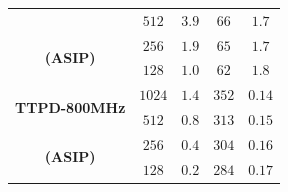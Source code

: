 \documentclass[11pt]{report}
\begin{document}
\begin{table}
{{\begin{tabular}{ccccc}
                                         & $512$  & $3.9$                                                                    & $66$                                                                      & $1.7$                                                                  \\
        \multirow{2}{*}{\bf (ASIP)}      & $256$  & $1.9$                                                                    & $65$                                                                      & $1.7$                                                                  \\
                                         & $128$  & $1.0$                                                                    & $62$                                                                      & $1.8$                                                                  \\
        \midrule
        \multirow{2}{*}{\bf TTPD-800MHz} & $1024$ & $1.4$                                                                    & $352$                                                                     & $0.14$                                                                 \\
                                         & $512$  & $0.8$                                                                    & $313$                                                                     & $0.15$                                                                 \\
        \multirow{2}{*}{\bf (ASIP)}      & $256$  & $0.4$                                                                    & $304$                                                                     & $0.16$                                                                 \\
                                         & $128$  & $0.2$                                                                    & $284$                                                                     & $0.17$                                                                 \\
        \bottomrule
      \end{tabular}}}
\end{table}
\end{document}
